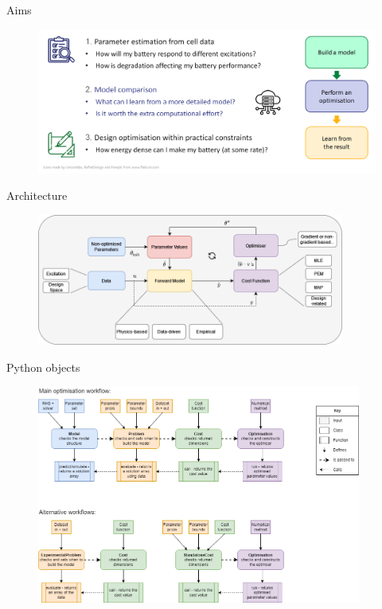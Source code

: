 \documentclass[aspectratio=169]{beamer}
\begin{document}
\begin{frame}{Aims}
    \vspace{-6mm}
    \begin{figure}
        \centering
        \includegraphics[width=\textwidth]{Images/Diagrams/ProblemTypes.png}
    \end{figure}
\end{frame}

\begin{frame}{Architecture}
    \vspace{-6mm}
    \begin{figure}
        \centering
        \includegraphics[width=0.9\textwidth]{Images/Diagrams/pybop_architecture.png}
        \label{fig:architecture}
    \end{figure}
\end{frame}

\begin{frame}{Python objects}
    \vspace{-6mm}
    \begin{figure}
        \centering
        \includegraphics[width=0.95\textwidth, trim={0 10cm 0 0},clip]{Images/Diagrams/pybop_objects.png}
        \label{fig:objects}
    \end{figure}
\end{frame}
\end{document}
